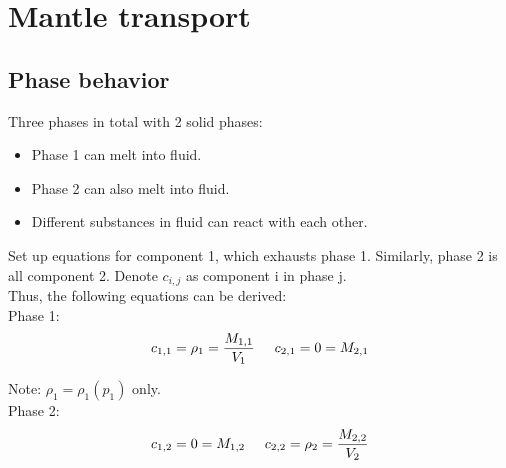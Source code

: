 

\section{Mantle transport}

\subsection{Phase behavior}

Three phases in total with 2 solid phases:

\begin{itemize}
		  \item Phase 1 can melt into fluid. 
		  \item Phase 2 can also melt into fluid.
		  \item Different substances in fluid can react with
each other.
\end{itemize}

\begin{center}
\end{center}

Set up equations for component 1,
which exhausts phase 1.
Similarly, phase 2 is all component 2.
Denote $c_{i,j}$ as component i in phase j.\\

Thus, the following equations can be derived:\\

Phase 1:
\begin{equation}
		  c_{1,1} = \rho_1 = \frac{M_{1,1}}{V_1} \hspace{0.5cm}c_{2,1} = 0 = M_{2,1} 
\end{equation}

\indent \indent Note: $\rho_1 = \rho_1(p_1)$ only.\\

Phase 2:
\begin{equation}
		  c_{1,2} = 0 = M_{1,2} \hspace{0.5cm}c_{2,2} = \rho_2 = \frac{M_{2,2}}{V_2}
\end{equation}

